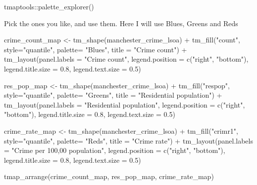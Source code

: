 \documentclass[
]{book}
\newenvironment{Shaded}{\begin{snugshade}}{\end{snugshade}}
\newcommand{\AttributeTok}[1]{\textcolor[rgb]{0.77,0.63,0.00}{#1}}
\newcommand{\FloatTok}[1]{\textcolor[rgb]{0.00,0.00,0.81}{#1}}
\newcommand{\FunctionTok}[1]{\textcolor[rgb]{0.00,0.00,0.00}{#1}}
\newcommand{\NormalTok}[1]{#1}
\newcommand{\OtherTok}[1]{\textcolor[rgb]{0.56,0.35,0.01}{#1}}
\newcommand{\SpecialCharTok}[1]{\textcolor[rgb]{0.00,0.00,0.00}{#1}}
\newcommand{\StringTok}[1]{\textcolor[rgb]{0.31,0.60,0.02}{#1}}
\begin{document}
\begin{Shaded}
\begin{Highlighting}[]
\NormalTok{tmaptools}\SpecialCharTok{::}\FunctionTok{palette\_explorer}\NormalTok{()}
\end{Highlighting}
\end{Shaded}

Pick the ones you like, and use them. Here I will use Blues, Greens and Reds

\begin{Shaded}
\begin{Highlighting}[]
\NormalTok{crime\_count\_map }\OtherTok{\textless{}{-}} \FunctionTok{tm\_shape}\NormalTok{(manchester\_crime\_lsoa) }\SpecialCharTok{+} 
  \FunctionTok{tm\_fill}\NormalTok{(}\StringTok{"count"}\NormalTok{, }\AttributeTok{style=}\StringTok{"quantile"}\NormalTok{, }\AttributeTok{palette=} \StringTok{"Blues"}\NormalTok{, }\AttributeTok{title =} \StringTok{"Crime count"}\NormalTok{) }\SpecialCharTok{+}
  \FunctionTok{tm\_layout}\NormalTok{(}\AttributeTok{panel.labels =} \StringTok{"Crime count"}\NormalTok{, }\AttributeTok{legend.position =} \FunctionTok{c}\NormalTok{(}\StringTok{"right"}\NormalTok{, }\StringTok{"bottom"}\NormalTok{),}
            \AttributeTok{legend.title.size =} \FloatTok{0.8}\NormalTok{, }\AttributeTok{legend.text.size =} \FloatTok{0.5}\NormalTok{)}

\NormalTok{res\_pop\_map }\OtherTok{\textless{}{-}} \FunctionTok{tm\_shape}\NormalTok{(manchester\_crime\_lsoa) }\SpecialCharTok{+} 
  \FunctionTok{tm\_fill}\NormalTok{(}\StringTok{"respop"}\NormalTok{, }\AttributeTok{style=}\StringTok{"quantile"}\NormalTok{, }\AttributeTok{palette=} \StringTok{"Greens"}\NormalTok{, }\AttributeTok{title =} \StringTok{"Residential population"}\NormalTok{) }\SpecialCharTok{+}
  \FunctionTok{tm\_layout}\NormalTok{(}\AttributeTok{panel.labels =} \StringTok{"Residential population"}\NormalTok{, }\AttributeTok{legend.position =} \FunctionTok{c}\NormalTok{(}\StringTok{"right"}\NormalTok{, }\StringTok{"bottom"}\NormalTok{),}
            \AttributeTok{legend.title.size =} \FloatTok{0.8}\NormalTok{, }\AttributeTok{legend.text.size =} \FloatTok{0.5}\NormalTok{)}

\NormalTok{crime\_rate\_map }\OtherTok{\textless{}{-}} \FunctionTok{tm\_shape}\NormalTok{(manchester\_crime\_lsoa) }\SpecialCharTok{+} 
  \FunctionTok{tm\_fill}\NormalTok{(}\StringTok{"crimr1"}\NormalTok{, }\AttributeTok{style=}\StringTok{"quantile"}\NormalTok{, }\AttributeTok{palette=} \StringTok{"Reds"}\NormalTok{, }\AttributeTok{title =} \StringTok{"Crime rate"}\NormalTok{) }\SpecialCharTok{+}
  \FunctionTok{tm\_layout}\NormalTok{(}\AttributeTok{panel.labels =} \StringTok{"Crime per 100,00 population"}\NormalTok{, }\AttributeTok{legend.position =} \FunctionTok{c}\NormalTok{(}\StringTok{"right"}\NormalTok{, }\StringTok{"bottom"}\NormalTok{),}
            \AttributeTok{legend.title.size =} \FloatTok{0.8}\NormalTok{, }\AttributeTok{legend.text.size =} \FloatTok{0.5}\NormalTok{)}

\FunctionTok{tmap\_arrange}\NormalTok{(crime\_count\_map, res\_pop\_map, crime\_rate\_map)}
\end{Highlighting}
\end{Shaded}
\end{document}
